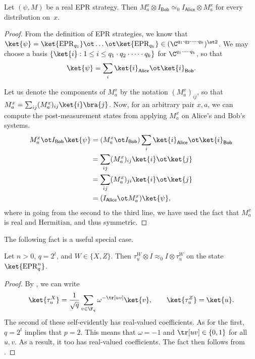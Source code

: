 \documentclass[11pt]{article}
\newcommand{\consistency}{\simeq}
\newcommand{\epr}{\mathrm{EPR}}
\newcommand{\reg}[1]{{\mathsf{#1}}}
\begin{document}
\begin{fact}\label{fact:heh-heh-heh-gonna-make-anand-prove-this-so-i-can-take-the-day-off}
Let $(\psi, M)$ be a real EPR strategy.
Then $M^x_a \otimes I_{\reg{Bob}} \consistency_0 I_{\reg{Alice}} \otimes M^x_a$ for every distribution on~$x$.
\end{fact}
\begin{proof}
  From the definition of EPR strategies, we know that $\ket{\psi} =
  \ket{\epr_{q_1}} \ot \dots \ot \ket{\epr_{q_k}} \in (\C^{q_1 \cdot
    q_2 \cdot \dots \cdot q_k})^{\ot 2}$. We may choose a basis
  $\{\ket{i} : 1 \leq i \leq q_1 \cdot q_2 \cdot \dots \cdot q_k\}$
  for $\C^{q_1 \cdot \dots \cdot q_k}$, so that
  \[ \ket{\psi} = \sum_{i} \ket{i}_{\reg{Alice}} \ot
    \ket{i}_{\reg{Bob}} . \]
  
Let us denote the components of $M^x_a$ by the notation
$(M^x_a)_{ij}$, so that $M^x_a = \sum_{ij} (M^x_a)_{ij}
\ket{i}\bra{j}$.  Now, for an arbitrary pair $x, a$, we can compute
the post-measurement states from applying $M^x_a$ on Alice's and Bob's systems.
\begin{align*}
  M^x_a \ot I_{\reg{Bob}} \ket{\psi} &= (M^x_a \ot I_{\reg{Bob}}) \sum_{i} \ket{i}_{\reg{Alice}}
                                       \ot \ket{i}_{\reg{Bob}} \\
                                     &= \sum_{ij} (M^x_a)_{ij} \ket{i}
                                       \ot \ket{j} \\
                                     &= \sum_{ij} (M^x_a)_{ji} \ket{i}
                                       \ot \ket{j} \\
                                     &= (I_{\reg{Alice}} \ot M^x_a) \ket{\psi},
\end{align*}
where in going from the second to the third line, we have used the
fact that $M^x_a$ is real and Hermitian, and thus symmetric.
\end{proof}

The following fact is a useful special case.

\begin{fact}\label{fact:the-ol-pauli-swaperoonie}
Let $n > 0$, $q = 2^t$, and $W \in \{X, Z\}$.
Then $\tau^W_u \otimes I \approx_0 I \otimes \tau^W_u$ on the state $\ket{\mathrm{EPR}_q^n}$.
\end{fact}
\begin{proof}
By , we can write 
\begin{equation*}
  \ket{\tau^X_u} = \frac{1}{\sqrt{q}} \sum_{v \in \F_q}
  \omega^{-\tr[uv]} \ket{v},\qquad \ket{\tau^Z_u} = \ket{u}.
\end{equation*}
The second of these self-evidently has real-valued coefficients.
As for the first, $q = 2^t$ implies that $p = 2$.
This means that $\omega = -1$ and $\tr[uv] \in \{0, 1\}$ for all $u, v$.
As a result, it too has real-valued coefficients.
The fact then follows from .
\end{proof}
\end{document}
